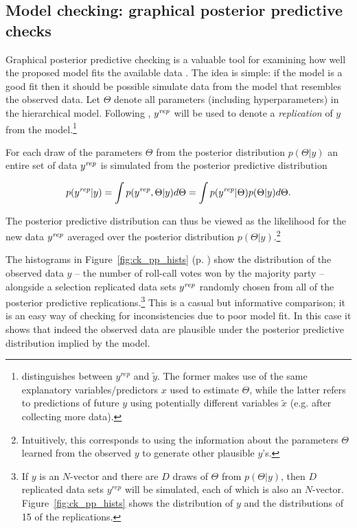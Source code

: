 \subsection{Model checking: graphical posterior predictive checks}
\label{subsection_model_checking}

Graphical posterior predictive checking is a valuable tool for examining how well the proposed model 
fits the available data . The idea is simple: if the model is a good fit 
then it should be possible simulate data from the model that resembles the observed data. Let $\Theta$ 
denote all parameters (including hyperparameters) in the hierarchical model. Following 
 , $y^{\it rep}$ will be used to denote a {\it replication} of $y$ from the model.\footnote{ distinguishes between $y^{rep}$ and $\tilde{y}$. The former 
 makes use of the same explanatory variables/predictors $x$ used to estimate $\Theta$, while the latter 
 refers to predictions of future $y$ using potentially different variables $\tilde{x}$ (e.g. after collecting more data).}

For each draw of the parameters $\Theta$ from the posterior distribution $p(\Theta | y)$ an entire set 
of data $y^{\it rep} $ is simulated from the posterior predictive distribution

\begin{equation*}
 p(y^{\it rep} | y) = \int p(y^{\it rep}, \Theta | y) d\Theta = \int p(y^{\it rep} | \Theta) p(\Theta | y) d\Theta.
\end{equation*}

\noindent The posterior predictive distribution can thus be viewed as the likelihood for the new data 
$y^{\it rep}$ averaged over the posterior distribution  $p(\Theta | y)$.\footnote{
Intuitively, this corresponds to using the information about the parameters $\Theta$ learned from 
the observed $y$ to generate other plausible $y$'s.}

The histograms in Figure~\ref{fig:ck_pp_hists} (p. \pageref{fig:ck_pp_hists}) show the 
distribution of the observed data $y$ -- the number of roll-call votes won by the majority party 
-- alongside a selection replicated data sets $y^{\it rep}$ randomly chosen from all of the posterior 
predictive replications.\footnote{If $y$ is an $N$-vector and there are $D$ draws of 
$\Theta$ from $p(\Theta | y)$, then $D$ replicated data sets $y^{rep}$ will be simulated, 
each of which is also an $N$-vector. Figure~\ref{fig:ck_pp_hists} shows the distribution of $y$ and the
distributions of 15 of the replications.} This is a casual but informative comparison; it is an easy way 
of checking for inconsistencies due to poor model fit. In this case it shows that indeed the observed 
data are plausible under the posterior predictive distribution implied by the model. 


